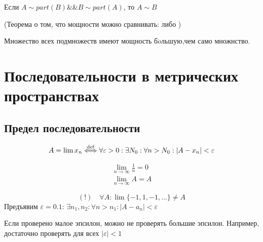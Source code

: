 \documentclass[12pt, a4paper]{article}
\begin{document}
    \begin{theorem}
      Если $A \sim part(B) \&\& B \sim part(A)$, то $A \sim B$

      (Теорема о том, что мощности можно сравнивать: либо )
    \end{theorem}

    \begin{statement}
      Множество всех подмножеств имеют мощность б$\acute{o}$льшую,чем само множнство.
    \end{statement}

    \section{Последовательности в метрических пространствах}

    \subsection{Предел последовательности}

    \begin{definition}
      \begin{equation}
        A = \lim{x_n} \overset{\mathrm{def}}{\Longleftrightarrow} \forall \varepsilon > 0: \exists N_0: \forall n > N_0: |A - x_n| < \varepsilon
      \end{equation}     
    \end{definition}

    \begin{definition}
    \end{definition}

    \begin{example}
      \begin{gather}
        \lim_{n \to \infty}{\frac{1}{n}} = 0 \\
        \lim_{n \to \infty}{A} = A
      \end{gather}
    \end{example}

    \begin{example}
      \begin{equation}
        (!) \quad \forall A: \lim{\{-1, 1, -1, \ldots\}} \neq A
      \end{equation}
      Предъявим $\varepsilon = 0.1$: $\exists n_1, n_2: \forall n > n_1: |A - a_{n}| < \varepsilon$
    \end{example}

    \begin{note}
      Если проверено малое эпсилон, можно не проверять большие эпсилон. Например, достаточно проверять для всех $|\varepsilon| < 1$ 
    \end{note}
\end{document}
